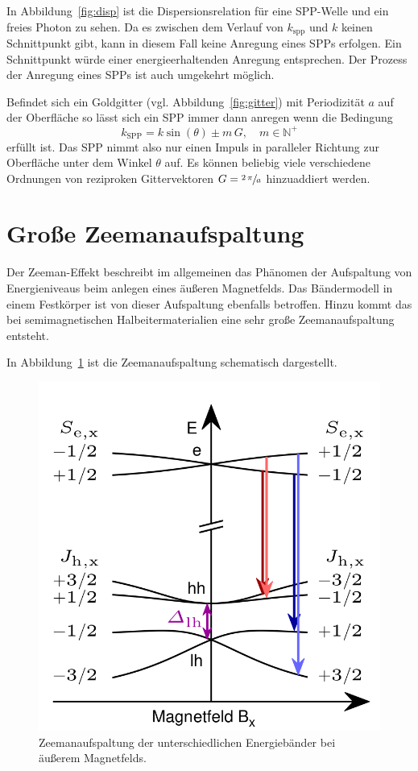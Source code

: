 In Abbildung~\ref{fig:disp} ist die Dispersionsrelation für eine SPP-Welle und ein freies Photon zu sehen. 
Da es zwischen dem Verlauf von $k_\text{spp}$ und $k$ keinen Schnittpunkt gibt, kann
in diesem Fall keine Anregung eines SPPs erfolgen. 
Ein Schnittpunkt würde  einer energieerhaltenden Anregung entsprechen.
Der Prozess der Anregung eines SPPs ist auch umgekehrt möglich.

Befindet sich ein Goldgitter (vgl. Abbildung~\ref{fig:gitter}) 
mit Periodizität $a$ auf der Oberfläche so lässt sich 
ein SPP immer dann anregen wenn die Bedingung
\begin{equation}
    k_\text{SPP} = k \sin(\theta) \pm m \, G, \quad  m \in \mathbb{N}^+
\end{equation}
erfüllt ist.
Das SPP nimmt also nur einen Impuls in paralleler Richtung zur Oberfläche unter dem Winkel $\theta$ auf.
Es können beliebig viele verschiedene Ordnungen von
reziproken Gittervektoren $G = \sfrac{2 \, \pi}{a}$ hinzuaddiert werden.

\section{Große Zeemanaufspaltung}
Der Zeeman-Effekt beschreibt im allgemeinen das Phänomen der Aufspaltung von 
Energieniveaus beim anlegen eines äußeren Magnetfelds.
Das Bändermodell in einem Festkörper ist von dieser Aufspaltung ebenfalls betroffen.
Hinzu kommt das bei semimagnetischen Halbeitermaterialien eine sehr große Zeemanaufspaltung
entsteht.\cite{zeeman}

In Abbildung~\ref{fig:zeeman} ist die Zeemanaufspaltung schematisch dargestellt.
\begin{figure}
    \centering
    \includegraphics[scale=0.25]{./Plots/zeeman.png}
    \caption{Zeemanaufspaltung der unterschiedlichen Energiebänder bei äußerem Magnetfelds.\cite{felix}}
    \label{fig:zeeman}
\end{figure}
\FloatBarrier

